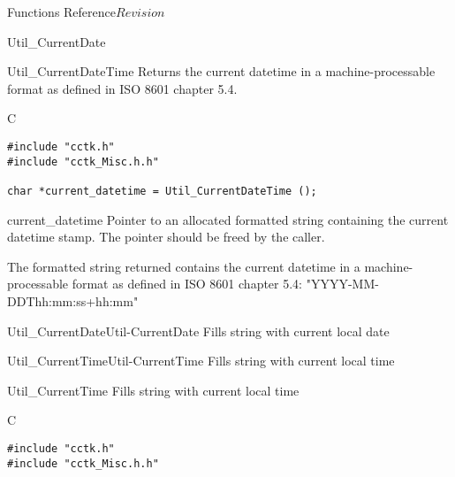 \begin{cactuspart}{ Functions Reference}{}{$Revision$}
\begin{FunctionDescription}{Util\_CurrentDate}
\end{FunctionDescription}


\begin{FunctionDescription}{Util\_CurrentDateTime}
\label{Util-CurrentDateTime}
Returns the current datetime in a machine-processable format
as defined in ISO 8601 chapter 5.4.

\begin{SynopsisSection}
\begin{Synopsis}{C}
\begin{verbatim}
#include "cctk.h"
#include "cctk_Misc.h.h"

char *current_datetime = Util_CurrentDateTime ();
\end{verbatim}
\end{Synopsis}
\end{SynopsisSection}

\begin{ResultSection}
\begin{Result}{current\_datetime}
Pointer to an allocated formatted string containing the current datetime stamp.
The pointer should be freed by the caller.
\end{Result}
\end{ResultSection}

\begin{Discussion}
The formatted string returned contains the current datetime in a
machine-processable format as defined in ISO 8601 chapter 5.4:
{\code "YYYY-MM-DDThh:mm:ss+hh:mm"}
\end{Discussion}

\begin{SeeAlsoSection}
\begin{SeeAlso2}{Util\_CurrentDate}{Util-CurrentDate}
  Fills string with current local date
\end{SeeAlso2}
\begin{SeeAlso2}{Util\_CurrentTime}{Util-CurrentTime}
  Fills string with current local time
\end{SeeAlso2}
\end{SeeAlsoSection}

\end{FunctionDescription}

\begin{FunctionDescription}{Util\_CurrentTime}
\label{Util-CurrentTime}
Fills string with current local time

\begin{SynopsisSection}
\begin{Synopsis}{C}
\begin{verbatim}
#include "cctk.h"
#include "cctk_Misc.h.h"


\end{verbatim}
\end{Synopsis}
\end{SynopsisSection}
\end{FunctionDescription}
\end{cactuspart}
